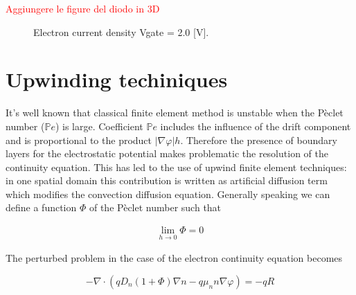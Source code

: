 \textcolor{red}{Aggiungere le figure del diodo in 3D}



\begin{figure}[!h]
\centering
{}
\end{figure} 



\begin{figure}[!h]
\centering
{}
\hspace{0.5cm}
\hspace{0.5cm}
\caption{Electron current density Vgate = 2.0 [V].}
\end{figure}


\section{Upwinding techiniques}

It's well known that classical finite element method is unstable when the P\`eclet number ($\mathbb{P}e$) is large. Coefficient $\mathbb{P}e$ includes the influence of the drift component and is proportional to the product $|\nabla \varphi| h$. Therefore the presence of boundary layers for the electrostatic potential makes problematic the resolution of the continuity equation. This has led to the use of upwind finite element techniques: in one spatial domain this contribution is written as artificial diffusion term which modifies the convection diffusion equation. Generally speaking we can define a function $\Phi$ of the P\`eclet number such that

\begin{align}
\label{eq: consistenza}
\lim_{h \to 0} \Phi = 0
\end{align}

The perturbed problem in the case of the electron continuity equation becomes

\begin{equation}
\label{eq: perturbed problem}
- \nabla \cdot (qD_n(1+\Phi)\nabla n - q \mu_n n \nabla \varphi) = -qR
\end{equation}

